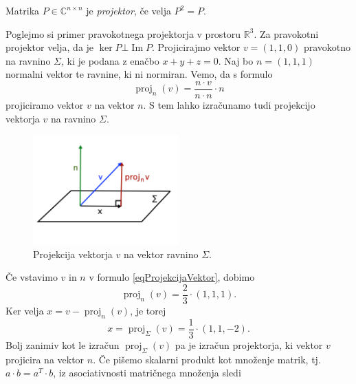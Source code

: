 \documentclass[mat1]{fmfdelo}
\newcommand{\R}{\mathbb R}
\newcommand{\C}{\mathbb C}
\DeclareMathOperator{\Ima}{Im}
\begin{document}
\begin{definicija}
    Matrika $P \in \C^{n \times n}$ je \emph{projektor}, če velja $P^2 = P$.
\end{definicija}
\begin{zgled}
    Poglejmo si primer pravokotnega projektorja v prostoru $\R^3$. Za pravokotni projektor velja, da je $\ker P \bot \Ima P$. Projicirajmo vektor $v = (1,1,0)$ pravokotno na ravnino $\Sigma$, ki je podana z enačbo $x + y + z = 0$. Naj bo $n = (1,1,1)$ normalni vektor te ravnine, ki ni normiran. Vemo, da s formulo
    \begin{equation}\label{eqProjekcijaVektor}
        \operatorname{proj}_{n}(v) = \frac{n \cdot v}{n\cdot n}\cdot n
    \end{equation}
    projiciramo vektor $v$ na vektor $n$. S tem lahko izračunamo tudi projekcijo vektorja $v$ na ravnino $\Sigma$.
    \begin{figure}[H]
        \vspace{-10pt}
        \centering
        \includegraphics[width=0.5\textwidth]{projekcija.jpg}
        \vspace{-25pt}
        \caption{Projekcija vektorja $v$ na vektor ravnino $\Sigma$.}
    \end{figure}
    Če vstavimo $v$ in $n$ v formulo \eqref{eqProjekcijaVektor}, dobimo
    \begin{equation*}
        \operatorname{proj}_{n}(v) = \frac{2}{3}\cdot (1,1,1).
    \end{equation*}
    Ker velja $x = v - \operatorname{proj}_{n}(v)$, je torej
    \begin{equation*}
        x = \operatorname{proj}_\Sigma (v) = \frac{1}{3}\cdot (1,1,-2).
    \end{equation*}
    Bolj zanimiv kot le izračun $\operatorname{proj}_\Sigma (v)$ pa je izračun projektorja, ki vektor $v$ projicira na vektor $n$. Če pišemo skalarni produkt kot množenje matrik, tj. $a\cdot b = a^T \cdot b$, iz asociativnosti matričnega množenja sledi
    \begin{equation*}

\end{equation*}
\end{zgled}
\end{document}
